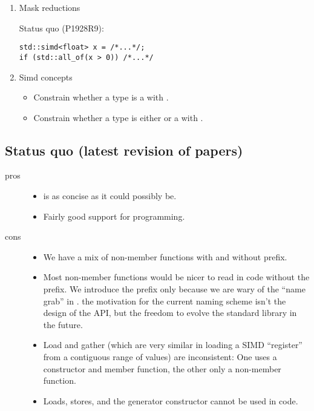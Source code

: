 \begin{enumerate}
  \item \label{fun:maskred} Mask reductions

    Status quo (P1928R9):
    \medskip\begin{lstlisting}[style=Vc]
std::simd<float> x = /*...*/;
if (std::all_of(x > 0)) /*...*/
    \end{lstlisting}

  \item \label{concept} Simd concepts
    \begin{itemize}
      \item Constrain whether a type is a \simdT with \std{}.
      \item Constrain whether a type is either \std{} or a \simdT
        with \std{}.
    \end{itemize}

\end{enumerate}

\subsection{Status quo (latest revision of  papers)}
\begin{description}
  \item[pros]
    \begin{itemize}
      \item \std{} is as concise as it could possibly be.

      \item Fairly good support for \simdgeneric programming.
    \end{itemize}

  \item[cons]
    \begin{itemize}
      \item We have a mix of non-member functions with and without
         prefix.

      \item Most non-member functions would be nicer to read in code without
        the  prefix.
        We introduce the prefix only because we are wary of the “name grab”
        in .
        \Ie the motivation for the current naming scheme isn't the design of
        the  API, but the freedom to evolve the standard library
        in the future.

      \item Load and gather (which are very similar in loading a SIMD
        “register” from a contiguous range of values) are inconsistent: One
        uses a constructor and member function, the other only a non-member
        function.

      \item Loads, stores, and the  generator constructor cannot
        be used in \simdgeneric code.
    \end{itemize}
\end{description}

